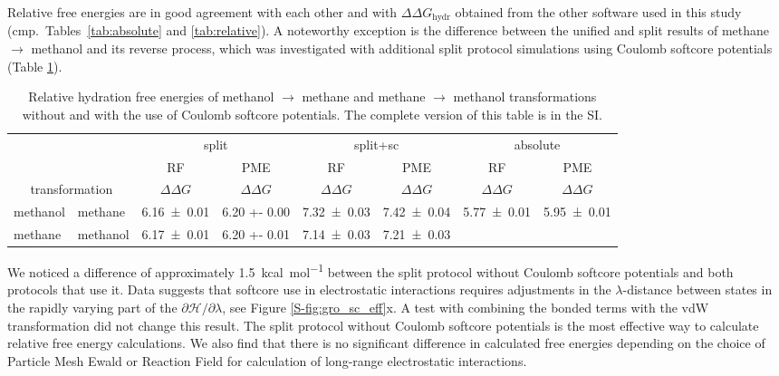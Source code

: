 \documentclass[journal=jctcce,manuscript=article]{achemso}
\begin{document}
Relative free energies are in good agreement with each other and with 
$\Delta \Delta G_{\mathrm{hydr}}$ obtained from the other software used in this 
study (cmp.\ Tables~\ref{tab:absolute} and \ref{tab:relative}).  A noteworthy 
exception is the difference between the unified and split results of methane 
$\rightarrow$ methanol and its reverse process, which was investigated with 
additional split protocol simulations using Coulomb softcore potentials (Table 
\ref{tab:eff-sc}).

\begin{table}[]
\centering
\caption{Relative hydration free energies of methanol $\rightarrow$ methane and 
methane $\rightarrow$
methanol transformations without and with the use of Coulomb softcore 
potentials. The complete version 
of this table is in the SI.}
\label{tab:eff-sc}
\begin{tabular}{@{}llclclcl@{}}
\toprule
 &  & \multicolumn{2}{c}{split} & \multicolumn{2}{c}{split+sc} & 
 \multicolumn{2}{c}{absolute} \\
 &  & RF & \multicolumn{1}{c}{PME} & RF & \multicolumn{1}{c}{PME} & RF & 
 \multicolumn{1}{c}{PME} \\
\multicolumn{2}{c}{transformation} & $\Delta \Delta G$ & 
\multicolumn{1}{c}{$\Delta \Delta G$} & $\Delta \Delta G$ & 
\multicolumn{1}{c}{$\Delta \Delta G$} & $\Delta \Delta G$ & 
\multicolumn{1}{c}{$\Delta \Delta G$} \\ \midrule
methanol & methane & \multicolumn{1}{l}{\num{6.16 +- 0.01}} & \num{6.20 +- 
0.00} & \multicolumn{1}{l}{\num{7.32+-0.03}} & \num{7.42+-0.04} & 
\multicolumn{1}{l}{\num{5.77 +- 0.01}} & \num{5.95 +- 0.01} \\
methane & methanol & \multicolumn{1}{l}{\num{6.17 +- 0.01}} & \num{6.20 +- 
0.01} & \multicolumn{1}{l}{\num{7.14+-0.03}} & \num{7.21+-0.03} & 
\multicolumn{1}{l}{} &  \\ \bottomrule
\end{tabular}
\end{table}

We noticed a difference of approximately \SI{1.5}{kcal.mol^{-1}} between the 
split protocol without  Coulomb softcore potentials and both protocols that 
use it. Data suggests that softcore use in electrostatic interactions requires 
adjustments in the $\lambda$-distance between states in the
rapidly varying part of the $\partial\mathscr{H}/\partial\lambda$, see Figure
\ref{S-fig:gro_sc_eff}x.  A test with combining the bonded terms with the vdW 
transformation did not change this result. The split protocol without Coulomb 
softcore potentials is the most effective way to calculate relative free energy 
calculations. We also find that there is no significant difference in 
calculated free energies depending on the choice of Particle Mesh Ewald or 
Reaction Field for calculation of long-range electrostatic interactions.
\end{document}
